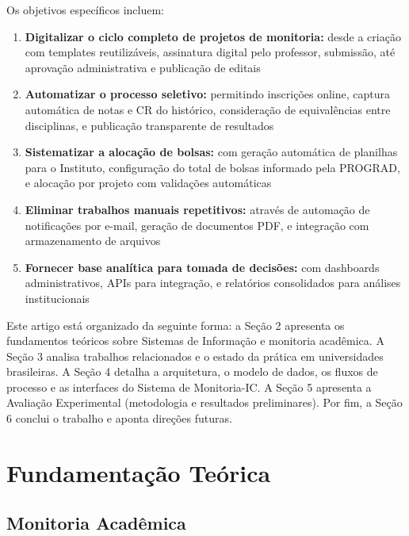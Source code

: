 \documentclass[portuguese]{sbc2025}%
\begin{document}
Os objetivos específicos incluem:

\begin{enumerate}
  \item \textbf{Digitalizar o ciclo completo de projetos de monitoria:} desde a criação com templates reutilizáveis, assinatura digital pelo professor, submissão, até aprovação administrativa e publicação de editais

  \item \textbf{Automatizar o processo seletivo:} permitindo inscrições online, captura automática de notas e CR do histórico, consideração de equivalências entre disciplinas, e publicação transparente de resultados

  \item \textbf{Sistematizar a alocação de bolsas:} com geração automática de planilhas para o Instituto, configuração do total de bolsas informado pela PROGRAD, e alocação por projeto com validações automáticas

  \item \textbf{Eliminar trabalhos manuais repetitivos:} através de automação de notificações por e-mail, geração de documentos PDF, e integração com armazenamento de arquivos

  \item \textbf{Fornecer base analítica para tomada de decisões:} com dashboards administrativos, APIs para integração, e relatórios consolidados para análises institucionais
\end{enumerate}

Este artigo está organizado da seguinte forma: a Seção 2 apresenta os fundamentos teóricos sobre Sistemas de Informação e monitoria acadêmica. A Seção 3 analisa trabalhos relacionados e o estado da prática em universidades brasileiras. A Seção 4 detalha a arquitetura, o modelo de dados, os fluxos de processo e as interfaces do Sistema de Monitoria-IC. A Seção 5 apresenta a Avaliação Experimental (metodologia e resultados preliminares). Por fim, a Seção 6 conclui o trabalho e aponta direções futuras.

\section{Fundamentação Teórica}
\label{sec:background}

\subsection{Monitoria Acadêmica}
\end{document}
